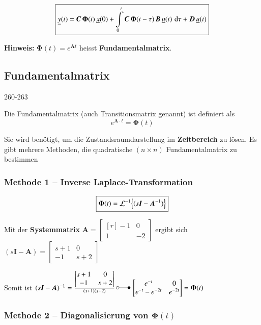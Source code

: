 $$ \boxed{ \underline{y}(t) = \bm{C} \, \bm{\Phi}(t) \, \underline{x}(0) + 
    \int\limits_0^t \bm{C} \, \bm{\Phi}(t - \tau) \, \bm{B} \, \underline{u}(t) \, \mathop{} \! \mathrm{d} \tau + \bm{D} \, \underline{u}(t) } $$

\textbf{Hinweis:} $\bm{\Phi}(t) = e^{\bm{A} t}$ heisst \textbf{Fundamentalmatrix}. 


\subsection{Fundamentalmatrix}{260-263}

Die Fundamentalmatrix (auch Transitionsmatrix genannt) ist definiert als
$$ \boxed{  e^{\bm{A} \cdot t} = \bm{\Phi}(t) } $$

Sie wird benötigt, um die Zustandsraumdarstellung im \textbf{Zeitbereich} zu lösen.
Es gibt mehrere Methoden, die quadratische $(n \times n)$ Fundamentalmatrix zu bestimmen


\subsubsection{Methode 1 -- Inverse Laplace-Transformation}

$$ \boxed{ \bm{\Phi}(t) = \mathcal{L}^{-1} \Bigl\{ (s \bm{I} - \bm{A}^{-1})  \Bigr\} } $$



Mit der \textbf{Systemmatrix} $\bm{A} = \begin{bmatrix*}[r] -1 & 0 \\ 1 & -2 \end{bmatrix*}$ ergibt sich 
$(s \bm{I} - \bm{A}) = \begin{bmatrix*} s+1 & 0 \\ -1 & s+2 \end{bmatrix*}$

Somit ist $(s \bm{I} - \bm{A})^{-1} = \frac{\begin{bmatrix*} s+1 & 0 \\ -1 & s+2 \end{bmatrix*}}{(s+1)(s+2)} \,
\laplace \, \begin{bmatrix*} e^{-t} & 0 \\ e^{-t} - e^{-2t} & e^{-2t} \end{bmatrix*} = \bm{\Phi}(t)$


\subsubsection{Methode 2 -- Diagonalisierung von $\bm{\Phi}(t)$}

